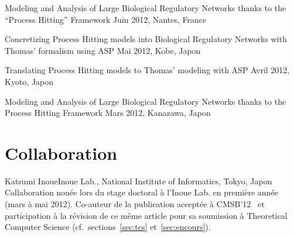 {Modeling and Analysis of Large Biological Regulatory Networks thanks to the “Process Hitting” Framework}
{Juin 2012, Nantes, France}

{Concretizing Process Hitting models into Biological Regulatory Networks with Thomas' formalism using ASP}
{Mai 2012, Kobe, Japon}

{Translating Process Hitting models to Thomas' modeling with ASP}
{Avril 2012, Kyoto, Japon}

{Modeling and Analysis of Large Biological Regulatory Networks thanks to the Process Hitting Framework}
{Mars 2012, Kanazawa, Japon}



\section{Collaboration}
\label{sec:collaboration}

\entree{$\bullet$}
{Katsumi Inoue}{Inoue Lab., National Institute of Informatics, Tokyo, Japon}
{Collaboration nouée lors du stage doctoral à l'Inoue Lab. en première année (mars à mai 2012).
Co-auteur de la publication acceptée à CMSB'12~\cite{FPIMR12-CMSB} et
participation à la révision de ce même article pour sa soumission à Theoretical Computer Science (cf.~sections~\ref{sec:tcs} et~\ref{sec:encours}).}


